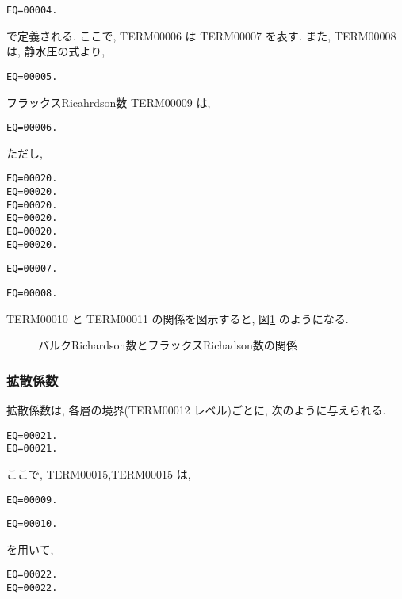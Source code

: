 \begin{verbatim}
EQ=00004.
\end{verbatim}
で定義される.
ここで, TERM00006 は TERM00007 を表す.
また, TERM00008 は, 静水圧の式より,
\begin{verbatim}
EQ=00005.
\end{verbatim}

フラックスRicahrdson数 TERM00009 は,

\begin{verbatim}
EQ=00006.
\end{verbatim}
ただし, 

\begin{verbatim}
EQ=00020.
EQ=00020.
EQ=00020.
EQ=00020.
EQ=00020.
EQ=00020.
\end{verbatim}
\begin{verbatim}
EQ=00007.
\end{verbatim}

\begin{verbatim}
EQ=00008.
\end{verbatim}

TERM00010 と TERM00011 の関係を図示すると,
図\ref{p-dif:rib-rif} のようになる.

\begin{figure}[htbp]
  \begin{center}
    \caption{バルクRichardson数とフラックスRichadson数の関係}
    \label{p-dif:rib-rif}
  \end{center}
\end{figure}

\subsubsection{拡散係数}

拡散係数は,
各層の境界(TERM00012 レベル)ごとに,
次のように与えられる.

\begin{verbatim}
EQ=00021.
EQ=00021.
\end{verbatim}

ここで, TERM00015,TERM00015 は,
\begin{verbatim}
EQ=00009.
\end{verbatim}
%
\begin{verbatim}
EQ=00010.
\end{verbatim}
を用いて,
\begin{verbatim}
EQ=00022.
EQ=00022.
\end{verbatim} 

